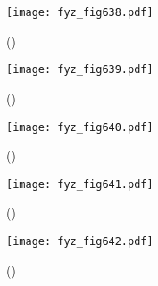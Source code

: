     \begin{figure}[ht!] %
      \centering
      \texttt{[image: fyz\_fig638.pdf]}
      \caption{
               (\cite[s.~707]{Feynman02})}
      \label{fyz_fig638}
    \end{figure}

    \begin{figure}[ht!] %
      \centering
      \texttt{[image: fyz\_fig639.pdf]}
      \caption{
               (\cite[s.~707]{Feynman02})}
      \label{fyz_fig639}
    \end{figure}

    \begin{figure}[ht!] %
      \centering
      \texttt{[image: fyz\_fig640.pdf]}
      \caption{
               (\cite[s.~707]{Feynman02})}
      \label{fyz_fig640}
    \end{figure}

    \begin{figure}[ht!] %
      \centering
      \texttt{[image: fyz\_fig641.pdf]}
      \caption{
               (\cite[s.~707]{Feynman02})}
      \label{fyz_fig641}
    \end{figure}

    \begin{figure}[ht!] %
      \centering
      \texttt{[image: fyz\_fig642.pdf]}
      \caption{
               (\cite[s.~707]{Feynman02})}
      \label{fyz_fig642}
    \end{figure}



\printbibliography[title={Seznam literatury},heading=subbibliography]
